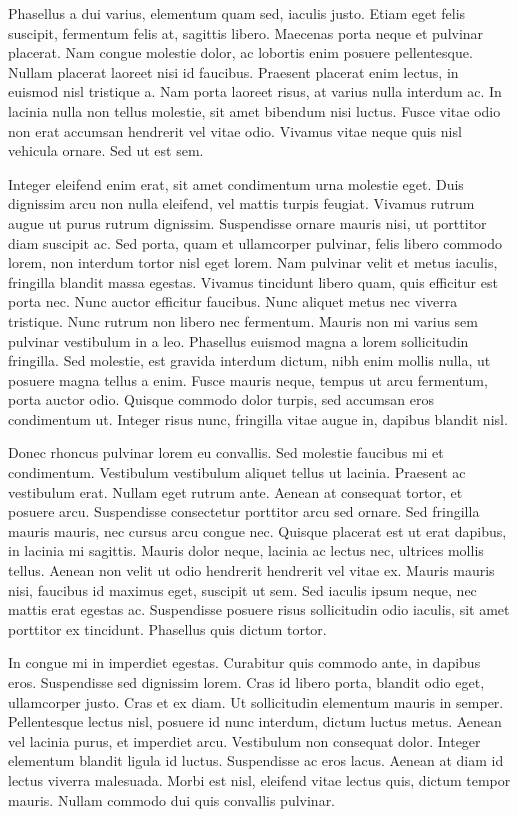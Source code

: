 \documentclass[a4paper,twoside,notitlepage,openright,11pt]{report}
\begin{document}
Phasellus a dui varius, elementum quam sed, iaculis justo. Etiam eget felis suscipit, fermentum felis at, sagittis libero. Maecenas porta neque et pulvinar placerat. Nam congue molestie dolor, ac lobortis enim posuere pellentesque. Nullam placerat laoreet nisi id faucibus. Praesent placerat enim lectus, in euismod nisl tristique a. Nam porta laoreet risus, at varius nulla interdum ac. In lacinia nulla non tellus molestie, sit amet bibendum nisi luctus. Fusce vitae odio non erat accumsan hendrerit vel vitae odio. Vivamus vitae neque quis nisl vehicula ornare. Sed ut est sem.

Integer eleifend enim erat, sit amet condimentum urna molestie eget. Duis dignissim arcu non nulla eleifend, vel mattis turpis feugiat. Vivamus rutrum augue ut purus rutrum dignissim. Suspendisse ornare mauris nisi, ut porttitor diam suscipit ac. Sed porta, quam et ullamcorper pulvinar, felis libero commodo lorem, non interdum tortor nisl eget lorem. Nam pulvinar velit et metus iaculis, fringilla blandit massa egestas. Vivamus tincidunt libero quam, quis efficitur est porta nec. Nunc auctor efficitur faucibus. Nunc aliquet metus nec viverra tristique. Nunc rutrum non libero nec fermentum. Mauris non mi varius sem pulvinar vestibulum in a leo. Phasellus euismod magna a lorem sollicitudin fringilla. Sed molestie, est gravida interdum dictum, nibh enim mollis nulla, ut posuere magna tellus a enim. Fusce mauris neque, tempus ut arcu fermentum, porta auctor odio. Quisque commodo dolor turpis, sed accumsan eros condimentum ut. Integer risus nunc, fringilla vitae augue in, dapibus blandit nisl.

Donec rhoncus pulvinar lorem eu convallis. Sed molestie faucibus mi et condimentum. Vestibulum vestibulum aliquet tellus ut lacinia. Praesent ac vestibulum erat. Nullam eget rutrum ante. Aenean at consequat tortor, et posuere arcu. Suspendisse consectetur porttitor arcu sed ornare. Sed fringilla mauris mauris, nec cursus arcu congue nec. Quisque placerat est ut erat dapibus, in lacinia mi sagittis. Mauris dolor neque, lacinia ac lectus nec, ultrices mollis tellus. Aenean non velit ut odio hendrerit hendrerit vel vitae ex. Mauris mauris nisi, faucibus id maximus eget, suscipit ut sem. Sed iaculis ipsum neque, nec mattis erat egestas ac. Suspendisse posuere risus sollicitudin odio iaculis, sit amet porttitor ex tincidunt. Phasellus quis dictum tortor.

In congue mi in imperdiet egestas. Curabitur quis commodo ante, in dapibus eros. Suspendisse sed dignissim lorem. Cras id libero porta, blandit odio eget, ullamcorper justo. Cras et ex diam. Ut sollicitudin elementum mauris in semper. Pellentesque lectus nisl, posuere id nunc interdum, dictum luctus metus. Aenean vel lacinia purus, et imperdiet arcu. Vestibulum non consequat dolor. Integer elementum blandit ligula id luctus. Suspendisse ac eros lacus. Aenean at diam id lectus viverra malesuada. Morbi est nisl, eleifend vitae lectus quis, dictum tempor mauris. Nullam commodo dui quis convallis pulvinar.
\end{document}
